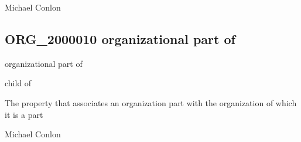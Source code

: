 \documentclass[letterpaper,10pt,english]{sphinxmanual}
\begin{document}
\begin{sphinxShadowBox}

\sphinxAtStartPar
Michael Conlon 
\end{sphinxShadowBox}
\begin{quote}

\ignorespaces \end{quote}


\subsection{ORG\_2000010 \sphinxhyphen{} organizational part of}
\label{\detokenize{doc-ORG_2000010:org-2000010-organizational-part-of}}\label{\detokenize{doc-ORG_2000010:index-0}}\label{\detokenize{doc-ORG_2000010::doc}}
\begin{sphinxShadowBox}

\sphinxAtStartPar
organizational part of
\end{sphinxShadowBox}

\begin{sphinxShadowBox}

\sphinxAtStartPar
child of
\end{sphinxShadowBox}

\begin{sphinxShadowBox}

\sphinxAtStartPar
{}
\end{sphinxShadowBox}

\begin{sphinxShadowBox}

\sphinxAtStartPar
The property that associates an organization part with the organization of which it is a part
\end{sphinxShadowBox}

\begin{sphinxShadowBox}

\sphinxAtStartPar
Michael Conlon 
\end{sphinxShadowBox}
\end{document}
